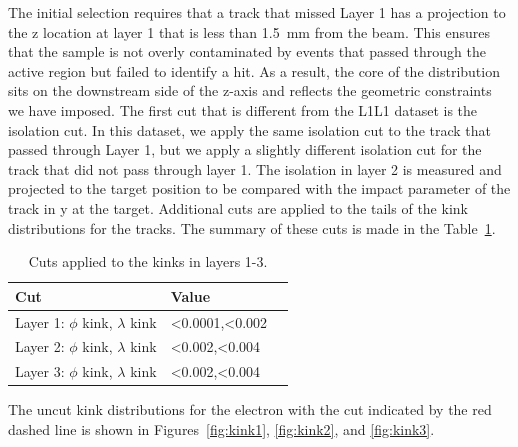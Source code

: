 The initial selection requires that a track that missed Layer 1 has a projection to the z location at layer 1 that is less than 1.5~mm from the beam. This ensures that the sample is not overly contaminated by events that passed through the active region but failed to identify a hit. As a result, the core of the distribution sits on the downstream side of the z-axis and reflects the geometric constraints we have imposed. The first cut that is different from the L1L1 dataset is the isolation cut. In this dataset, we apply the same isolation cut to the track that passed through Layer 1, but we apply a slightly different isolation cut for the track that did not pass through layer 1. The isolation in layer 2 is measured and projected to the target position to be compared with the impact parameter of the track in y at the target. Additional cuts are applied to the tails of the kink distributions for the tracks. The summary of these cuts is made in the Table~\ref{kink_cuts}.

\begin{table}[H]
\caption{Cuts applied to the kinks in layers 1-3.}
\label{kink_cuts}
\centering
\begin{tabular}{lll}
\toprule
Cut & Value \\
\midrule
Layer 1: $\phi$ kink, $\lambda$ kink & <0.0001,<0.002\\
Layer 2: $\phi$ kink, $\lambda$ kink & <0.002,<0.004\\
Layer 3: $\phi$ kink, $\lambda$ kink & <0.002,<0.004\\
\bottomrule
\end{tabular}
\end{table}

The uncut kink distributions for the electron with the cut indicated by the red dashed line is shown in Figures~\ref{fig:kink1}, \ref{fig:kink2}, and \ref{fig:kink3}.

